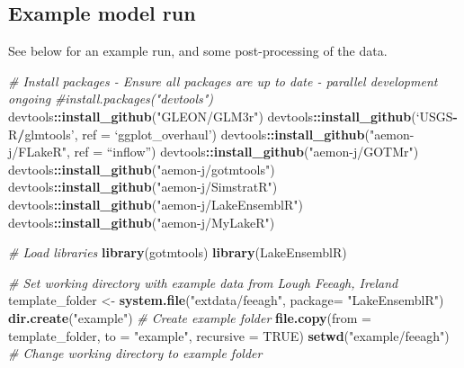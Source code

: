 \documentclass[
]{article}
\newenvironment{Shaded}{\begin{snugshade}}{\end{snugshade}}
\newcommand{\CommentTok}[1]{\textcolor[rgb]{0.56,0.35,0.01}{\textit{#1}}}
\newcommand{\DataTypeTok}[1]{\textcolor[rgb]{0.13,0.29,0.53}{#1}}
\newcommand{\KeywordTok}[1]{\textcolor[rgb]{0.13,0.29,0.53}{\textbf{#1}}}
\newcommand{\NormalTok}[1]{#1}
\newcommand{\OperatorTok}[1]{\textcolor[rgb]{0.81,0.36,0.00}{\textbf{#1}}}
\newcommand{\OtherTok}[1]{\textcolor[rgb]{0.56,0.35,0.01}{#1}}
\newcommand{\StringTok}[1]{\textcolor[rgb]{0.31,0.60,0.02}{#1}}
\begin{document}
\hypertarget{example-model-run}{%
\subsection{Example model run}\label{example-model-run}}

See below for an example run, and some post-processing of the data.

\begin{Shaded}
\begin{Highlighting}[]
\CommentTok{# Install packages - Ensure all packages are up to date - parallel development ongoing}
\CommentTok{#install.packages("devtools")}
\NormalTok{devtools}\OperatorTok{::}\KeywordTok{install_github}\NormalTok{(}\StringTok{"GLEON/GLM3r"}\NormalTok{)}
\NormalTok{devtools}\OperatorTok{::}\KeywordTok{install_github}\NormalTok{(‘USGS}\OperatorTok{-}\NormalTok{R}\OperatorTok{/}\NormalTok{glmtools’, }\DataTypeTok{ref =}\NormalTok{ ‘ggplot_overhaul’)}
\NormalTok{devtools}\OperatorTok{::}\KeywordTok{install_github}\NormalTok{(}\StringTok{"aemon-j/FLakeR"}\NormalTok{, }\DataTypeTok{ref =}\NormalTok{ “inflow”)}
\NormalTok{devtools}\OperatorTok{::}\KeywordTok{install_github}\NormalTok{(}\StringTok{"aemon-j/GOTMr"}\NormalTok{)}
\NormalTok{devtools}\OperatorTok{::}\KeywordTok{install_github}\NormalTok{(}\StringTok{"aemon-j/gotmtools"}\NormalTok{)}
\NormalTok{devtools}\OperatorTok{::}\KeywordTok{install_github}\NormalTok{(}\StringTok{"aemon-j/SimstratR"}\NormalTok{)}
\NormalTok{devtools}\OperatorTok{::}\KeywordTok{install_github}\NormalTok{(}\StringTok{"aemon-j/LakeEnsemblR"}\NormalTok{)}
\NormalTok{devtools}\OperatorTok{::}\KeywordTok{install_github}\NormalTok{(}\StringTok{"aemon-j/MyLakeR"}\NormalTok{)}

\CommentTok{# Load libraries}
\KeywordTok{library}\NormalTok{(gotmtools)}
\KeywordTok{library}\NormalTok{(LakeEnsemblR)}

\CommentTok{# Set working directory with example data from Lough Feeagh, Ireland}
\NormalTok{template_folder <-}\StringTok{ }\KeywordTok{system.file}\NormalTok{(}\StringTok{"extdata/feeagh"}\NormalTok{, }\DataTypeTok{package=} \StringTok{"LakeEnsemblR"}\NormalTok{)}
\KeywordTok{dir.create}\NormalTok{(}\StringTok{"example"}\NormalTok{) }\CommentTok{# Create example folder}
\KeywordTok{file.copy}\NormalTok{(}\DataTypeTok{from =}\NormalTok{ template_folder, }\DataTypeTok{to =} \StringTok{"example"}\NormalTok{, }\DataTypeTok{recursive =} \OtherTok{TRUE}\NormalTok{)}
\KeywordTok{setwd}\NormalTok{(}\StringTok{"example/feeagh"}\NormalTok{) }\CommentTok{# Change working directory to example folder}


\end{Highlighting}
\end{Shaded}
\end{document}
